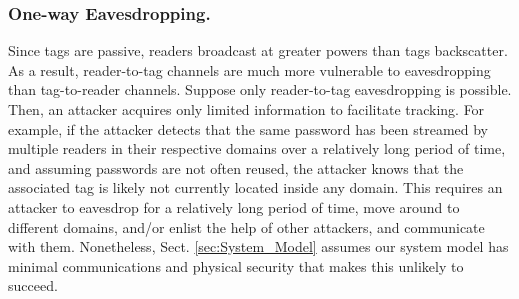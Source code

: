 \subsubsection{One-way Eavesdropping.}
Since tags are passive, readers broadcast at greater powers than tags backscatter.  As a result, reader-to-tag channels are much more vulnerable to eavesdropping than tag-to-reader channels.  Suppose only reader-to-tag eavesdropping is possible.  Then, an attacker acquires only limited information to facilitate tracking.  For example, if the attacker detects that the same password has been streamed by multiple readers in their respective domains over a relatively long period of time, and assuming passwords are not often reused, the attacker knows that the associated tag is likely not currently located inside any domain.  This requires an attacker to eavesdrop for a relatively long period of time, move around to different domains, and/or enlist the help of other attackers, and communicate with them.  Nonetheless, Sect. \ref{sec:System_Model} assumes our system model has minimal communications and physical security that makes this unlikely to succeed.

